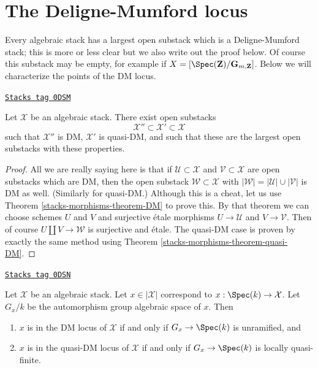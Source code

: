 \section{The Deligne-Mumford locus}
\label{stacks-morphisms-section-DM}
Every algebraic stack has a largest open substack which is a
Deligne-Mumford stack; this is more or less clear but we also
write out the proof below. Of course this substack may be empty,
for example if $X = [\Spec(\mathbf{Z})/\mathbf{G}_{m, \mathbf{Z}}]$.
Below we will characterize the points of the DM locus.

\begin{lemma}
\label{stacks-morphisms-lemma-open-DM-locus}
\href{https://stacks.math.columbia.edu/tag/0DSM}{\texttt{Stacks tag 0DSM}}

Let $\mathcal{X}$ be an algebraic stack. There exist open substacks
$$
\mathcal{X}'' \subset \mathcal{X}' \subset \mathcal{X}
$$
such that $\mathcal{X}''$ is DM, $\mathcal{X}'$ is quasi-DM, and
such that these are the largest open substacks with these properties.
\end{lemma}

\begin{proof}
All we are really saying here is that if $\mathcal{U} \subset \mathcal{X}$
and $\mathcal{V} \subset \mathcal{X}$ are open substacks which are DM,
then the open substack $\mathcal{W} \subset \mathcal{X}$
with $|\mathcal{W}| = |\mathcal{U}| \cup |\mathcal{V}|$
is DM as well. (Similarly for quasi-DM.) Although this is a cheat, let
us use Theorem \ref{stacks-morphisms-theorem-DM} to prove this.
By that theorem we can choose
schemes $U$ and $V$ and surjective \'etale morphisms
$U \to \mathcal{U}$ and $V \to \mathcal{V}$.
Then of course $U \amalg V \to \mathcal{W}$ is surjective and \'etale.
The quasi-DM case is proven by exactly the same method using
Theorem \ref{stacks-morphisms-theorem-quasi-DM}.
\end{proof}

\begin{lemma}
\label{stacks-morphisms-lemma-points-DM-locus}
\href{https://stacks.math.columbia.edu/tag/0DSN}{\texttt{Stacks tag 0DSN}}

Let $\mathcal{X}$ be an algebraic stack. Let $x \in |\mathcal{X}|$
correspond to $x : \Spec(k) \to \mathcal{X}$. Let $G_x/k$
be the automorphism group algebraic space of $x$. Then
\begin{enumerate}
\item  $x$ is in the DM locus of $\mathcal{X}$
if and only if $G_x \to \Spec(k)$ is unramified, and
\item $x$ is in the quasi-DM locus of $\mathcal{X}$
if and only if $G_x \to \Spec(k)$ is locally quasi-finite.
\end{enumerate}
\end{lemma}

